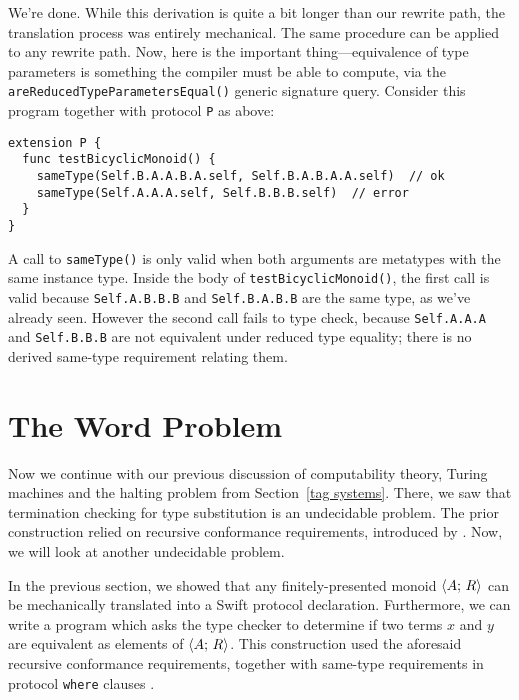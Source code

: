 \documentclass[../generics]{subfiles}
\begin{document}
We're done. While this derivation is quite a bit longer than our rewrite path, the translation process was entirely mechanical. The same procedure can be applied to any rewrite path. Now, here is the important thing---equivalence of type parameters is something the compiler must be able to compute, via the \texttt{areReducedTypeParametersEqual()} generic signature query.
Consider this program together with protocol \texttt{P} as above:
\begin{Verbatim}
extension P {
  func testBicyclicMonoid() {
    sameType(Self.B.A.A.B.A.self, Self.B.A.B.A.A.self)  // ok
    sameType(Self.A.A.A.self, Self.B.B.B.self)  // error
  }
}
\end{Verbatim}
A call to \texttt{sameType()} is only valid when both arguments are metatypes with the same instance type. Inside the body of \texttt{testBicyclicMonoid()}, the first call is valid because \verb|Self.A.B.B.B| and \verb|Self.B.A.B.B| are the same type, as we've already seen. However the second call fails to type check, because \verb|Self.A.A.A| and \verb|Self.B.B.B| are not equivalent under reduced type equality; there is no derived same-type requirement relating them.

\section{The Word Problem}\label{word problem}

Now we continue with our previous discussion of computability theory, Turing machines and the halting problem from Section~\ref{tag systems}. There, we saw that termination checking for type substitution is an undecidable problem. The prior construction relied on recursive conformance requirements, introduced by \cite{se0157}. Now, we will look at another undecidable problem.

In the previous section, we showed that any finitely-presented monoid $\langle A;\,R\rangle$ can be mechanically translated into a Swift protocol declaration. Furthermore, we can write a program which asks the type checker to determine if two terms $x$ and $y$ are equivalent as elements of $\langle A;\,R\rangle$. This construction used the aforesaid recursive conformance requirements, together with same-type requirements in protocol \texttt{where} clauses \cite{se0142}.
\end{document}
